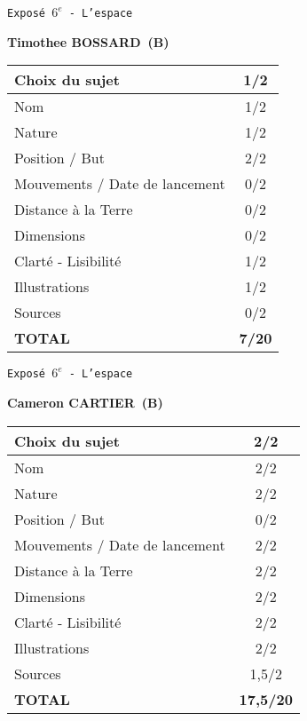 	\LARGE{\texttt{Expos\'e $6^e$ - L'espace}}
	\vspace*{1cm}

	\textbf{Timothee BOSSARD\ (B)}

	\vspace*{1.5cm}
	\begin{tabular}{|l|c|}
		\hline
		Choix du sujet & 1/2 \\
		\hline
		Nom & 1/2 \\
		\hline
		Nature & 1/2 \\
		\hline
		Position / But & 2/2 \\
		\hline
		Mouvements / Date de lancement & 0/2 \\
		\hline
		Distance \`a la Terre & 0/2 \\
		\hline
		Dimensions & 0/2 \\
		\hline
		Clart\'e - Lisibilit\'e & 1/2 \\
		\hline
		Illustrations & 1/2 \\
		\hline
		Sources & 0/2 \\
		\hline
		\textbf{TOTAL}  & \textbf{7/20} \\
		\hline
	\end{tabular}

	\vspace*{1cm}
	
	\newpage
	\LARGE{\texttt{Expos\'e $6^e$ - L'espace}}
	\vspace*{1cm}

	\textbf{Cameron CARTIER\ (B)}

	\vspace*{1.5cm}
	\begin{tabular}{|l|c|}
		\hline
		Choix du sujet & 2/2 \\
		\hline
		Nom & 2/2 \\
		\hline
		Nature & 2/2 \\
		\hline
		Position / But & 0/2 \\
		\hline
		Mouvements / Date de lancement & 2/2 \\
		\hline
		Distance \`a la Terre & 2/2 \\
		\hline
		Dimensions & 2/2 \\
		\hline
		Clart\'e - Lisibilit\'e & 2/2 \\
		\hline
		Illustrations & 2/2 \\
		\hline
		Sources & 1,5/2 \\
		\hline
		\textbf{TOTAL}  & \textbf{17,5/20} \\
		\hline
	\end{tabular}

